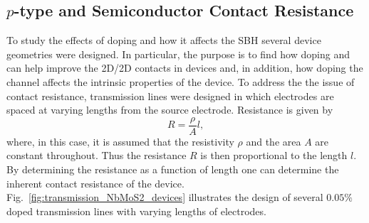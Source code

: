 \subsection{$p$-type  and  Semiconductor Contact Resistance}\label{subsec:mos2_doping_contact}
To study the effects of doping and how it affects the \ac{SBH} several  device geometries were designed. In particular, the purpose is to find how doping  and  can help improve the 2D/2D contacts in devices and, in addition, how doping the channel affects the intrinsic properties of the device. To address the the issue of contact resistance, transmission lines were designed in which electrodes are spaced at varying lengths from the source electrode. Resistance is given by 
\begin{equation}\label{eq:resistance_fundamental}
R = \frac{\rho}{A} l,
\end{equation}
where, in this case, it is assumed that the resistivity $\rho$ and the area $A$ are constant throughout. Thus the resistance $R$ is then proportional to the length $l$. By determining the resistance as a function of length one can determine the inherent contact resistance of the device. Fig.~\ref{fig:transmission_NbMoS2_devices} illustrates the design of several $0.05\%$  doped  transmission lines with varying lengths of electrodes.
